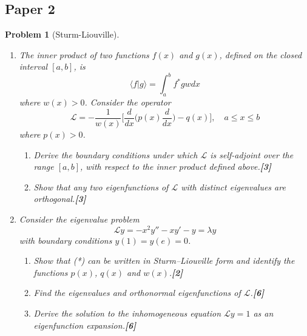 \documentclass[a4paper]{article}
\theoremstyle{new}
\newtheorem{qns}{Problem}[section]
\begin{document}
\subsection{Paper 2}
\begin{qns}[Sturm-Liouville]\leavevmode
\begin{enumerate}[label=(\roman*)]
\item The inner product of two functions $f(x)$ and $g(x)$, defined on the closed interval $[a, b]$, is
$$\langle f|g\rangle=\int_a^bf^*gwdx$$
where $w(x) > 0$. Consider the operator
$$\mathcal{L}=-\frac{1}{w(x)}\bigg[\frac{d}{dx}\bigg(p(x)\frac{d}{dx}\bigg)-q(x)\bigg],\quad a\leq x\leq b$$
where $p(x) > 0$.
\begin{enumerate}[label=(\alph*)]
\item Derive the boundary conditions under which $\mathcal{L}$ is self-adjoint over the range $[a, b]$, with respect to the inner product defined above.\hfill\textbf{[3]}
\item Show that any two eigenfunctions of $\mathcal{L}$ with distinct eigenvalues are orthogonal.\hfill\textbf{[3]}\end{enumerate}
\item Consider the eigenvalue problem
\begin{equation}
    \mathcal{L}y=-x^2y''-xy'-y=\lambda y\tag{*}
\end{equation}
with boundary conditions $y(1) = y(e) = 0$.
\begin{enumerate}[label=(\alph*)]
\item Show that (*) can be written in Sturm–Liouville form and identify the functions $p(x)$, $q(x)$ and $w(x)$.\hfill\textbf{[2]}
\item Find the eigenvalues and orthonormal eigenfunctions of $\mathcal{L}$.\hfill\textbf{[6]}
\item Derive the solution to the inhomogeneous equation $\mathcal{L}y=1$ as an eigenfunction expansion.\hfill\textbf{[6]}
\end{enumerate}
\end{enumerate}
\end{qns}
\end{document}
